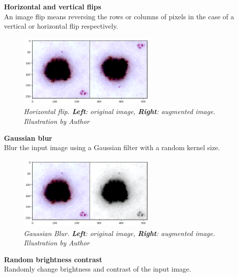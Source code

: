 \newpage

\textbf{Horizontal and vertical flips} \\

An image flip means reversing the rows or columns of pixels in the case of a vertical or horizontal flip respectively.

\begin{figure}[H]
  \centering
  \includegraphics[width=0.6\textwidth]{imatges/methodological_contribution/horizontal-flip.png}
  \caption[Horizontal Flip]{\textit{Horizontal flip. \textbf{Left}: original image, \textbf{Right}: augmented image. Illustration by Author}}
\end{figure}

\vspace{0.5cm}
\textbf{Gaussian blur} \\

Blur the input image using a Gaussian filter with a random kernel size.

\begin{figure}[H]
  \centering
  \includegraphics[width=0.6\textwidth]{imatges/methodological_contribution/gaussianblur.png}
  \caption[Gaussian Blur]{\textit{Gaussian Blur. \textbf{Left}: original image, \textbf{Right}: augmented image. Illustration by Author}}
\end{figure}

\newpage

\textbf{Random brightness contrast} \\

Randomly change brightness and contrast of the input image.

